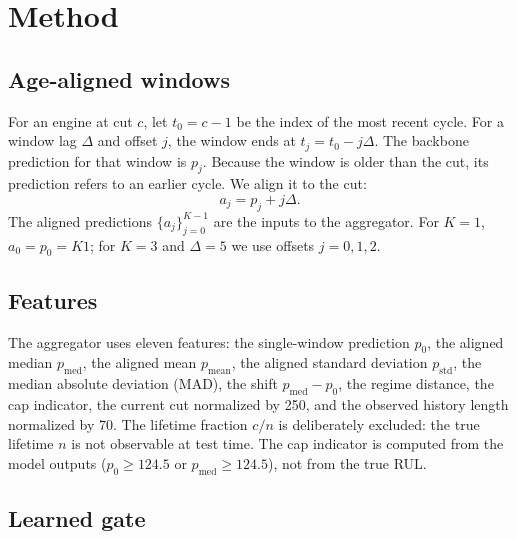\section{Method}
\label{sec:method}

\subsection{Age-aligned windows}

For an engine at cut $c$, let $t_0=c-1$ be the index of the most recent cycle.
For a window lag $\Delta$ and offset $j$, the window ends at $t_j=t_0-j\Delta$.
The backbone prediction for that window is $p_j$. Because the window is older
than the cut, its prediction refers to an earlier cycle. We align it to the cut:
\begin{equation}
a_j = p_j + j\Delta .
\label{eq:align}
\end{equation}
The aligned predictions $\{a_j\}_{j=0}^{K-1}$ are the inputs to the aggregator.
For $K=1$, $a_0=p_0=K1$; for $K=3$ and $\Delta=5$ we use offsets $j=0,1,2$.

\subsection{Features}

The aggregator uses eleven features: the single-window prediction $p_0$, the
aligned median $p_{\mathrm{med}}$, the aligned mean $p_{\mathrm{mean}}$, the
aligned standard deviation $p_{\mathrm{std}}$, the median absolute deviation
(MAD), the shift $p_{\mathrm{med}}-p_0$, the regime distance, the cap indicator,
the current cut normalized by 250, and the observed history length normalized by
70. The lifetime fraction $c/n$ is deliberately excluded: the true lifetime $n$
is not observable at test time. The cap indicator is computed from the model
outputs ($p_0\ge 124.5$ or $p_{\mathrm{med}}\ge 124.5$), not from the true RUL.

\subsection{Learned gate}

